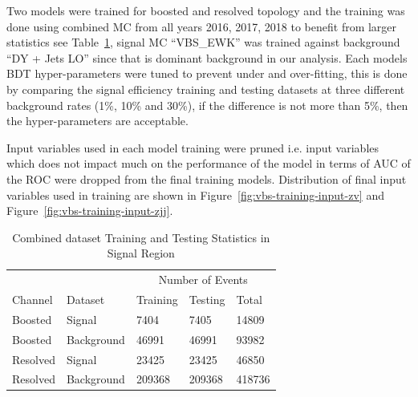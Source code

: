 Two models were trained for boosted and resolved topology and
the training was done using combined MC from all years 2016, 2017, 2018
to benefit from larger statistics see Table~\ref{tab:training-stats},
signal MC ``VBS\_EWK'' was trained against background ``DY + Jets LO'' since
that is dominant background in our analysis.
Each models \gls{BDT} hyper-parameters were tuned to prevent under and over-fitting,
this is done by comparing the signal efficiency
training and testing datasets at three different background rates (1\%, 10\% and 30\%),
if the difference is not more than 5\%, then the hyper-parameters are
acceptable.

Input variables used in each model training were pruned i.e.
input variables which does not impact much on the
performance of the model in terms of \gls{AUC} of the \gls{ROC}
were dropped from the final training models.
Distribution of final input variables
used in training are shown in Figure~\ref{fig:vbs-training-input-zv} and Figure~\ref{fig:vbs-training-input-zjj}.

\begin{table}[!ht]
  \centering
  \caption{Combined dataset Training and Testing Statistics in Signal Region}
  \begin{tabular}{lllll}%
    \toprule
             &            & \multicolumn{3}{c}{Number of Events}                    \\
    \cmidrule(lr){3-5}
    Channel  & Dataset    & Training                             & Testing & Total  \\
    \midrule
    Boosted  & Signal     & 7404                                 & 7405    & 14809  \\
    Boosted  & Background & 46991                                & 46991   & 93982  \\
    \midrule
    Resolved & Signal     & 23425                                & 23425   & 46850  \\
    Resolved & Background & 209368                               & 209368  & 418736 \\
    \bottomrule
  \end{tabular}\label{tab:training-stats}
\end{table}

